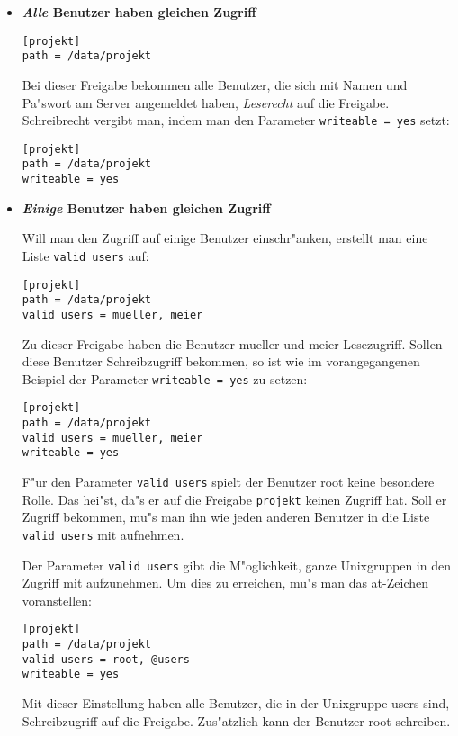 \documentclass{scrartcl}
\newcommand{\param}{\texttt}
\begin{document}
\begin{itemize}
\item {\bf \emph{Alle} Benutzer haben gleichen Zugriff}

\begin{verbatim}
[projekt]
path = /data/projekt
\end{verbatim}

Bei dieser Freigabe bekommen alle Benutzer, die sich mit Namen und
Pa"swort am Server angemeldet haben, \emph{Leserecht} auf die
Freigabe. Schreibrecht vergibt man, indem man den Parameter
\param{writeable = yes} setzt:

\begin{verbatim}
[projekt]
path = /data/projekt
writeable = yes
\end{verbatim}

\item {\bf \emph{Einige} Benutzer haben gleichen Zugriff}

Will man den Zugriff auf einige Benutzer einschr"anken, erstellt man
eine Liste \param{valid users} auf:

\begin{verbatim}
[projekt]
path = /data/projekt
valid users = mueller, meier
\end{verbatim}

Zu dieser Freigabe haben die Benutzer mueller und meier
Lesezugriff. Sollen diese Benutzer Schreibzugriff bekommen, so ist wie
im vorangegangenen Beispiel der Parameter \param{writeable = yes} zu
setzen:

\begin{verbatim}
[projekt]
path = /data/projekt
valid users = mueller, meier
writeable = yes
\end{verbatim}

F"ur den Parameter \param{valid users} spielt der Benutzer root keine
besondere Rolle. Das hei"st, da"s er auf die Freigabe \param{projekt}
keinen Zugriff hat. Soll er Zugriff bekommen, mu"s man ihn wie jeden
anderen Benutzer in die Liste \param{valid users} mit aufnehmen.

Der Parameter \param{valid users} gibt die M"oglichkeit, ganze
Unixgruppen in den Zugriff mit aufzunehmen. Um dies zu erreichen, mu"s
man das at-Zeichen voranstellen:

\begin{verbatim}
[projekt]
path = /data/projekt
valid users = root, @users
writeable = yes
\end{verbatim}

Mit dieser Einstellung haben alle Benutzer, die in der Unixgruppe
users sind, Schreibzugriff auf die Freigabe. Zus"atzlich kann der
Benutzer root schreiben.


\end{itemize}
\end{document}
